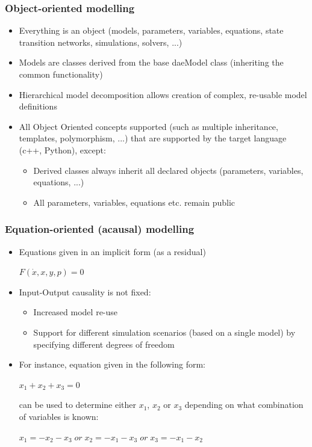\documentclass[compress,newPxFont,sthlmFooter]{beamer}
\begin{document}
\begin{frame}
\frametitle{Object-oriented modelling}
\begin{block}{}
\begin{itemize}
  \item Everything is an object (models, parameters, variables, equations, state transition networks, simulations, solvers, ...) 
  \item Models are classes derived from the base daeModel class (inheriting the common functionality)
  \item Hierarchical model decomposition allows creation of complex, re-usable model definitions
  \item All Object Oriented concepts supported (such as multiple inheritance, templates, polymorphism, ...) 
        that are supported by the target language (c++, Python), except:
  \begin{itemize}
      \item Derived classes always inherit all declared objects (parameters, variables, equations, ...)  
      \item All parameters, variables, equations etc. remain public
  \end{itemize}
\end{itemize}
\end{block}
\end{frame}

\begin{frame}
\frametitle{Equation-oriented (acausal) modelling}
\begin{block}{}
\begin{itemize}
  \item Equations given in an implicit form (as a residual)
    \begin{center}
      $F(\dot {x}, x, y, p) = 0$
    \end{center}
  \item Input-Output causality is not fixed:
  \begin{itemize}
    \item Increased model re-use
    \item Support for different simulation scenarios (based on a single model) by specifying different degrees of freedom
  \end{itemize}
  \item For instance, equation given in the following form:
    \begin{center}
      $x_1 + x_2 + x_3 = 0$
    \end{center}
    can be used to determine either $x_1$, $x_2$ or $x_3$ depending on what combination of variables is known:
    \begin{center}
      $x_1 = -x_2 - x_3 \; or \;  
      x_2 = -x_1 - x_3 \; or \; 
      x_3 = -x_1 - x_2$
    \end{center}
\end{itemize}
\end{block}
\end{frame}
\end{document}
